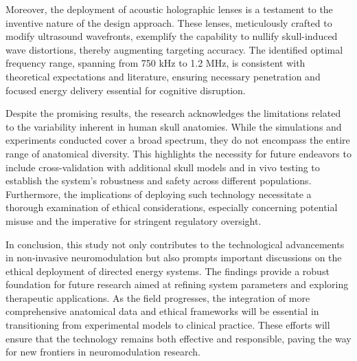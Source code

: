 \documentclass{article}
\begin{document}
Moreover, the deployment of acoustic holographic lenses is a testament to the inventive nature of the design approach. These lenses, meticulously crafted to modify ultrasound wavefronts, exemplify the capability to nullify skull-induced wave distortions, thereby augmenting targeting accuracy. The identified optimal frequency range, spanning from 750 kHz to 1.2 MHz, is consistent with theoretical expectations and literature, ensuring necessary penetration and focused energy delivery essential for cognitive disruption.

Despite the promising results, the research acknowledges the limitations related to the variability inherent in human skull anatomies. While the simulations and experiments conducted cover a broad spectrum, they do not encompass the entire range of anatomical diversity. This highlights the necessity for future endeavors to include cross-validation with additional skull models and in vivo testing to establish the system's robustness and safety across different populations. Furthermore, the implications of deploying such technology necessitate a thorough examination of ethical considerations, especially concerning potential misuse and the imperative for stringent regulatory oversight.

In conclusion, this study not only contributes to the technological advancements in non-invasive neuromodulation but also prompts important discussions on the ethical deployment of directed energy systems. The findings provide a robust foundation for future research aimed at refining system parameters and exploring therapeutic applications. As the field progresses, the integration of more comprehensive anatomical data and ethical frameworks will be essential in transitioning from experimental models to clinical practice. These efforts will ensure that the technology remains both effective and responsible, paving the way for new frontiers in neuromodulation research.
\end{document}
